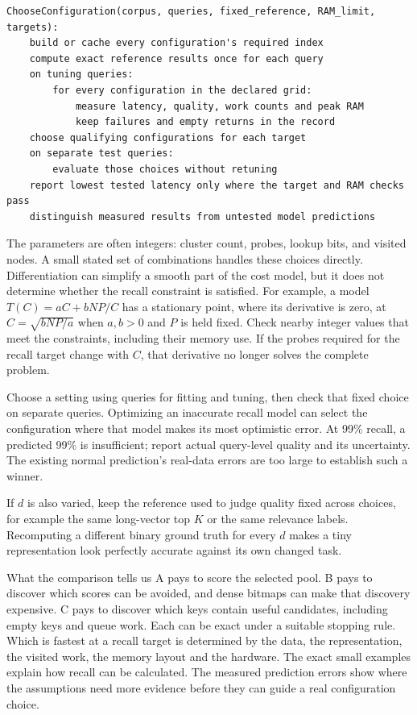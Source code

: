 \par\noindent\begin{minipage}{\linewidth}
\begin{lstlisting}[caption={A defensible finite-grid experiment.}]
ChooseConfiguration(corpus, queries, fixed_reference, RAM_limit, targets):
    build or cache every configuration's required index
    compute exact reference results once for each query
    on tuning queries:
        for every configuration in the declared grid:
            measure latency, quality, work counts and peak RAM
            keep failures and empty returns in the record
    choose qualifying configurations for each target
    on separate test queries:
        evaluate those choices without retuning
    report lowest tested latency only where the target and RAM checks pass
    distinguish measured results from untested model predictions
\end{lstlisting}
\end{minipage}\par

The parameters are often integers: cluster count, probes, lookup bits, and visited nodes. A
small stated set of combinations handles these choices directly. Differentiation can simplify a smooth
part of the cost model, but it does not determine whether the recall constraint is satisfied.
For example, a model $T(C)=aC+bNP/C$ has a stationary point, where its derivative is zero, at
$C=\sqrt{bNP/a}$ when $a,b>0$ and $P$ is held fixed. Check nearby integer values that meet the constraints, including
their memory use. If the probes required for the recall target change with $C$, that derivative no
longer solves the complete problem.

Choose a setting using queries for fitting and tuning, then check that fixed choice on
separate queries. Optimizing an inaccurate recall model can select the configuration where
that model makes its most optimistic error. At 99\% recall, a predicted 99\% is insufficient;
report actual query-level quality and its uncertainty. The existing normal prediction's
real-data errors are too large to establish such a winner.

If $d$ is also varied, keep the reference used to judge quality fixed across choices, for example the same
long-vector top $K$ or the same relevance labels. Recomputing a different binary ground truth
for every $d$ makes a tiny representation look perfectly accurate against its own changed task.



\begin{resultbox}{What the comparison tells us}
A pays to score the selected pool. B pays to discover which scores can be avoided, and dense
bitmaps can make that discovery expensive. C pays to discover which keys contain useful
candidates, including empty keys and queue work. Each can be exact under a suitable stopping
rule. Which is fastest at a recall target is determined by the data, the representation,
the visited work, the memory layout and the hardware. The exact small examples explain how
recall can be calculated. The measured prediction errors show where the assumptions need more
evidence before they can guide a real configuration choice.
\end{resultbox}
